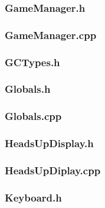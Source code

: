 \documentclass{article}
\begin{document}
\subsubsection{GameManager.h}
	

\subsubsection{GameManager.cpp}
	
	 				
\subsubsection{GCTypes.h}
	
	 				
\subsubsection{Globals.h}
	 
	 				
\subsubsection{Globals.cpp}
	  				
	 				
\subsubsection{HeadsUpDisplay.h}
	 
	 				
\subsubsection{HeadsUpDiplay.cpp}
	 		
	 				
\subsubsection{Keyboard.h}
	 
	 				
\end{document}
